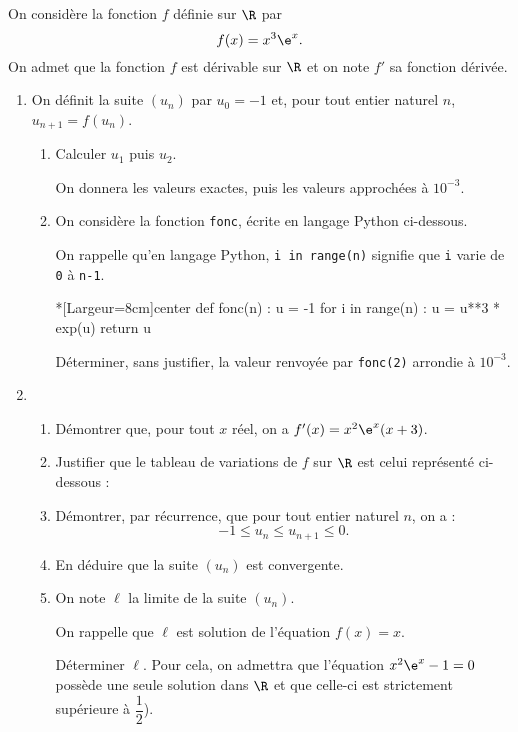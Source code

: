 On considère la fonction $f$ définie sur $\R$ par \[f(x) = x^3\e^x.\]
%
On admet que la fonction $f$ est dérivable sur $\R$ et on note $f'$ sa fonction dérivée.

\begin{enumerate}
	\item On définit la suite $\left(u_n\right)$ par $u_0 = - 1$ et, pour tout entier naturel $n$, $u_{n+1} = f\left(u_n\right)$.
	\begin{enumerate}
		\item Calculer $u_1$  puis $u_2$.
		
		On donnera les valeurs exactes, puis les valeurs approchées à $10^{-3}$.
		\item On considère la fonction \texttt{fonc}, écrite en langage \textsf{Python} ci-dessous.
		
		\smallskip
		
		On rappelle qu'en langage \textsf{Python}, \texttt{i in range(n)} signifie que \texttt{i} varie de \texttt{0} à \texttt{n-1}.
\begin{CodePythonLstAlt}*[Largeur=8cm]{center}
def fonc(n) :
	u = -1
	for i in range(n) :
		u = u**3 * exp(u)
	return u
\end{CodePythonLstAlt}
		Déterminer, sans justifier, la valeur renvoyée par \texttt{fonc(2)} arrondie à $10^{-3}$.
	\end{enumerate}
	\item 
	\begin{enumerate}
		\item Démontrer que, pour tout $x$ réel, on a $f'(x) = x^2\e^x(x + 3)$.
		\item Justifier que le tableau de variations de $f$ sur $\R$ est celui représenté ci-dessous :
		
		\begin{center}
		\end{center}
		\item Démontrer, par récurrence, que pour tout entier naturel $n$, on a : \[- 1 \leqslant u_n \leqslant u_{n+1} \leqslant 0.\]
		\item En déduire que la suite $\left(u_n\right)$ est convergente.
		\item On note $\ell$ la limite de la suite $\left(u_n\right)$.
		
		On rappelle que $\ell$ est solution de l'équation $f(x) = x$.
		
		Déterminer $\ell$. Pour cela, on admettra que l'équation $x^2\e^x - 1 = 0$ possède une seule solution dans $\R$ et que celle-ci est strictement supérieure à $\dfrac12$).
	\end{enumerate}
\end{enumerate}

